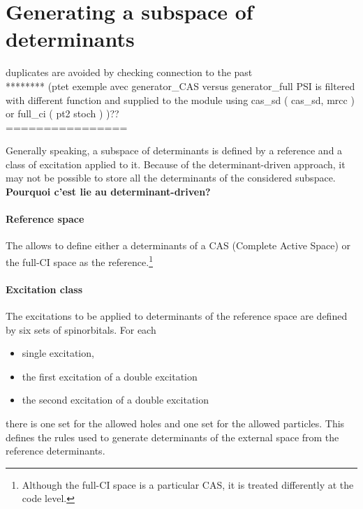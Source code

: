 \documentclass[./thesis.tex]{subfiles}
\begin{document}

\section{Generating a subspace of determinants}
\alert{
duplicates are avoided by checking connection to the past \\
******** (ptet exemple avec generator\_CAS versus generator\_full PSI is filtered with different function and supplied to the module using cas\_sd ( cas\_sd, mrcc ) or full\_ci ( pt2 stoch ) )?? \\
================
}

Generally speaking, a subspace of determinants is defined by a reference and a class of excitation applied to it.
\alert{
Because of the determinant-driven approach, it may not be possible to store all the determinants of the considered subspace. \textbf{Pourquoi c'est lie au determinant-driven?}
}



\paragraph{Reference space}
The \QP allows to define either a determinants of a CAS (Complete Active Space) or the full-CI space as the reference.\footnote{Although the full-CI space is a particular CAS, it is treated differently at the code level.}

\paragraph{Excitation class}
The excitations to be applied to determinants of the reference space are defined by six sets of spinorbitals. For each 
\begin{itemize}
\item
single excitation,
\item
the first excitation of a double excitation
\item
the second excitation of a double excitation
\end{itemize}
there is one set for the allowed holes and one set for the allowed particles.
This defines the rules used to generate determinants of the external space from the reference determinants.
\end{document}
